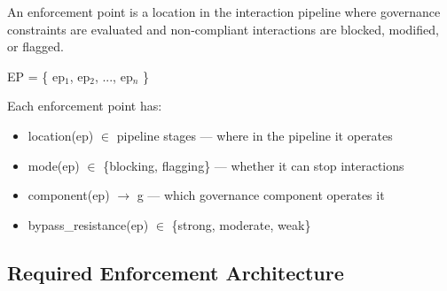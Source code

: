 \begin{cdef}
An enforcement point is a location in the interaction pipeline where governance constraints are evaluated and non-compliant interactions are blocked, modified, or flagged.

\begin{claddisp}
EP = \{ ep$_1$, ep$_2$, ..., ep$_n$ \}\\
\end{claddisp}
Each enforcement point has:
\begin{itemize}
  \item location(ep) $\in$ pipeline stages   --- where in the pipeline it operates
  \item mode(ep) $\in$ \{blocking, flagging\}  --- whether it can stop interactions
  \item component(ep) $\to$ g                --- which governance component operates it
  \item bypass\_\allowbreak{}resistance(ep) $\in$ \{strong, moderate, weak\}
\end{itemize}

\end{cdef}


\subsection{Required Enforcement Architecture}



